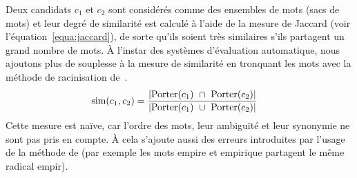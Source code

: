         Deux candidats $c_1$ et $c_2$ sont considérés comme des ensembles de
        mots (sacs de mots) et leur degré de similarité est calculé à l'aide de
        la mesure de Jaccard (voir l'équation~\ref{equa:jaccard}), de sorte qu'ils
        soient très similaires s'ils partagent un grand nombre de mots.
        À l'instar des systèmes d'évaluation automatique, nous ajoutons plus de
        souplesse à la mesure de similarité en tronquant les mots avec la
        méthode de racinisation de~.
        \begin{align}
          \text{sim}(c_1, c_2) &= \frac{|\textnormal{Porter}(c_1)\ \cap\ \textnormal{Porter}(c_2)|}{|\textnormal{Porter}(c_1)\ \cup\ \textnormal{Porter}(c_2)|} \label{equa:jaccard}
        \end{align}
        Cette mesure est \og{}naïve\fg{}, car l'ordre des mots, leur ambiguïté
        et leur synonymie ne sont pas pris en compte. À cela s'ajoute aussi des
        erreurs introduites par l'usage de la méthode de
         (par exemple les mots
        \og{}empire\fg{} et \og{}empirique\fg{} partagent le même radical
        \og{}empir\fg{}).

